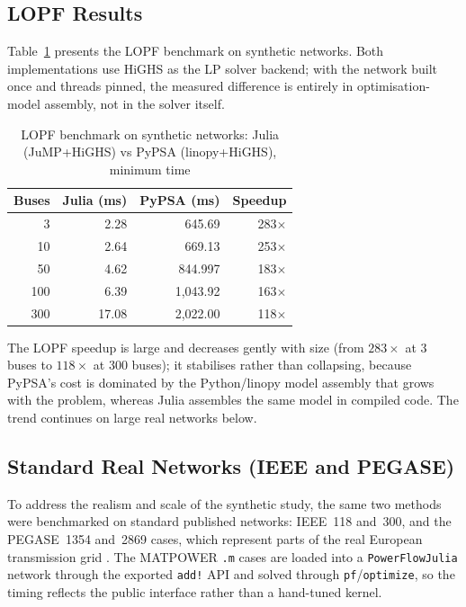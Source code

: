 \subsection{LOPF Results}

Table~\ref{tab:lopf_benchmark} presents the LOPF benchmark on synthetic networks. Both implementations use HiGHS as the LP solver backend; with the network built once and threads pinned, the measured difference is entirely in optimisation-model assembly, not in the solver itself.

\begin{table}[H]
\centering
\caption{LOPF benchmark on synthetic networks: Julia (JuMP+HiGHS) vs PyPSA (linopy+HiGHS), minimum time}
\label{tab:lopf_benchmark}
\begin{tabular}{rrrr}
\toprule
\textbf{Buses} & \textbf{Julia (ms)} & \textbf{PyPSA (ms)} & \textbf{Speedup} \\
\midrule
    3 &  2.28 &   645.69 & 283$\times$ \\
   10 &  2.64 &   669.13 & 253$\times$ \\
   50 &  4.62 &   844.997 & 183$\times$ \\
  100 &  6.39 & 1{,}043.92 & 163$\times$ \\
  300 & 17.08 & 2{,}022.00 & 118$\times$ \\
\bottomrule
\end{tabular}
\end{table}

The LOPF speedup is large and decreases gently with size (from $283\times$ at 3 buses to $118\times$ at 300 buses); it stabilises rather than collapsing, because PyPSA's cost is dominated by the Python/linopy model assembly that grows with the problem, whereas Julia assembles the same model in compiled code. The trend continues on large real networks below.

\subsection{Standard Real Networks (IEEE and PEGASE)}
\label{sec:bench_real}

To address the realism and scale of the synthetic study, the same two methods were benchmarked on standard published networks: IEEE~118 and~300, and the PEGASE~1354 and~2869 cases, which represent parts of the real European transmission grid \cite{josz2016ac}. The MATPOWER \texttt{.m} cases are loaded into a \texttt{PowerFlowJulia} network through the exported \texttt{add!} API and solved through \texttt{pf}/\texttt{optimize}, so the timing reflects the public interface rather than a hand-tuned kernel.

